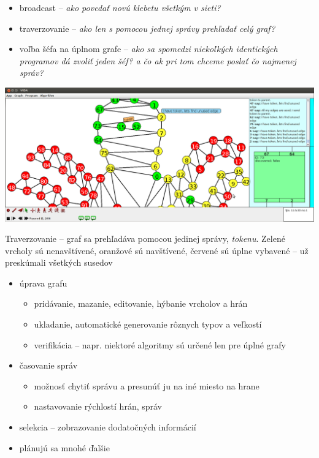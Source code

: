 

\begin{itemize}

    \item broadcast -- \textit{ako povedať novú klebetu všetkým v sieti?}
    \item traverzovanie -- \textit{ako len s pomocou jednej správy prehľadať celý graf?}
    \item voľba šéfa na úplnom grafe -- \textit{ako sa spomedzi niekoľkých identických programov
    dá zvoliť jeden šéf? a čo ak pri tom chceme poslať čo najmenej správ?}

\end{itemize}

\includegraphics[width=\columnwidth]{traverz}
\caption{Traverzovanie -- graf sa prehľadáva pomocou jedinej správy, \emph{tokenu}. Zelené vrcholy
sú nenavštívené, oranžové sú navštívené, červené sú úplne vybavené -- už preskúmali všetkých susedov}

    

\begin{itemize}
    \item úprava grafu
    \begin{itemize}
        \item pridávanie, mazanie, editovanie, hýbanie vrcholov a hrán
        \item ukladanie, automatické generovanie rôznych typov a veľkostí
        \item verifikácia -- napr. niektoré algoritmy sú určené len pre úplné grafy
    \end{itemize}
    \item časovanie správ
    \begin{itemize}
        \item možnosť chytiť správu a presunúť ju na iné miesto na hrane
        \item nastavovanie rýchlostí hrán, správ
    \end{itemize}
    \item selekcia -- zobrazovanie dodatočných informácií
    \item plánujú sa mnohé ďalšie


\end{itemize}

